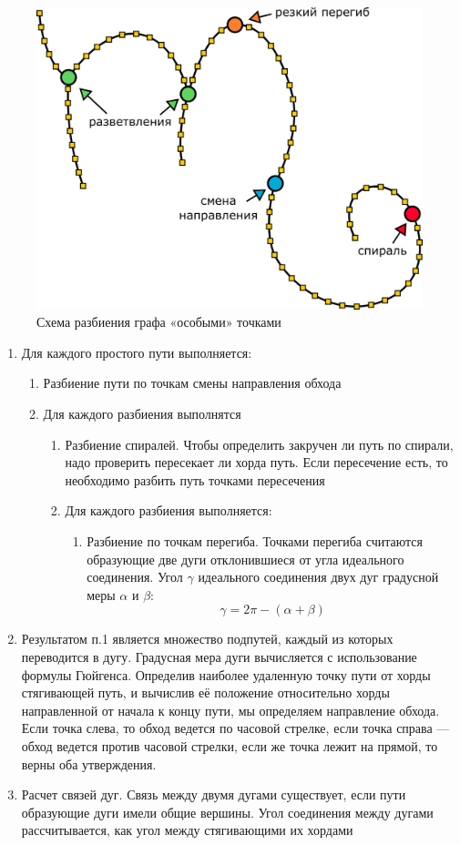 \begin{figure}[h]
\centering
\includegraphics[width=0.75\linewidth,keepaspectratio]{images/graph}
\caption{Схема разбиения графа «особыми» точками}
\end{figure}

\begin{enumerate}
\item Для каждого простого пути выполняется:
	\begin{enumerate}
		\item Разбиение пути по точкам смены направления обхода
		\item Для каждого разбиения выполнятся
		\begin{enumerate}
			\item Разбиение спиралей. Чтобы определить закручен ли путь по спирали, надо проверить пересекает ли хорда путь. Если пересечение есть, то необходимо разбить путь точками пересечения
			\item Для каждого разбиения выполняется:
			\begin{enumerate}
				\item Разбиение по точкам перегиба. Точками перегиба считаются образующие две дуги отклонившиеся от угла идеального соединения. Угол $\gamma$ идеального соединения двух дуг градусной меры $\alpha$ и $\beta$: $$\gamma=2\pi-(\alpha+\beta)$$
			\end{enumerate}
		\end{enumerate}		
	\end{enumerate}	
\item Результатом п.1 является множество подпутей, каждый из которых переводится в дугу. Градусная мера дуги вычисляется с использование формулы Гюйгенса. Определив наиболее удаленную точку пути от хорды стягивающей путь, и вычислив её положение относительно хорды направленной от начала к концу пути, мы определяем направление обхода. Если точка слева, то обход ведется по часовой стрелке, если точка справа — обход ведется против часовой стрелки, если же точка лежит на прямой, то верны оба утверждения.
\item Расчет связей дуг. Связь между двумя дугами существует, если пути образующие дуги имели общие вершины. Угол соединения между дугами рассчитывается, как угол между стягивающими их хордами
\end{enumerate}

